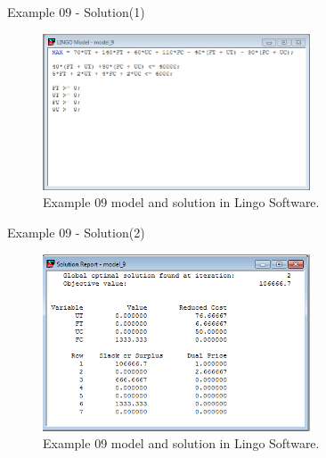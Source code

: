 \begin{frame}{Example 09 - Solution(1)}
\begin{figure}
    \includegraphics[width=300px]{slides/ex09/screenshot_a.png}
    \caption{Example 09 model and solution in Lingo Software.}
\end{figure}
\end{frame}

\begin{frame}{Example 09 - Solution(2)}
\begin{figure}
    \includegraphics[width=300px]{slides/ex09/screenshot_b.png}
    \caption{Example 09 model and solution in Lingo Software.}
\end{figure}
\end{frame}

